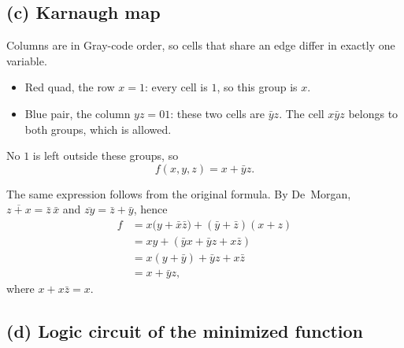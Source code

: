 \documentclass[11pt,a4paper]{article}
\begin{document}
\subsection*{(c) Karnaugh map}

Columns are in Gray-code order, so cells that share an edge differ in exactly one variable.

\begin{center}
\end{center}

\begin{itemize}
  \item Red quad, the row \(x=1\): every cell is \(1\), so this group is \(x\).
  \item Blue pair, the column \(yz=01\): these two cells are \(\bar{y}z\).
    The cell \(x\bar{y}z\) belongs to both groups, which is allowed.
\end{itemize}

No \(1\) is left outside these groups, so
\[
f(x,y,z)=x+\bar{y}z.
\]

The same expression follows from the original formula.
By De~Morgan, \(\overline{z+x}=\bar{z}\,\bar{x}\) and \(\overline{zy}=\bar{z}+\bar{y}\), hence
\begin{align*}
f
&= x\bigl(y+\bar{x}\bar{z}\bigr)+(\bar{y}+\bar{z})(x+z) \\
&= xy + (\bar{y}x+\bar{y}z+x\bar{z}) \\
&= x(y+\bar{y})+\bar{y}z+x\bar{z} \\
&= x+\bar{y}z,
\end{align*}
where \(x+x\bar{z}=x\).

\subsection*{(d) Logic circuit of the minimized function}
\end{document}
